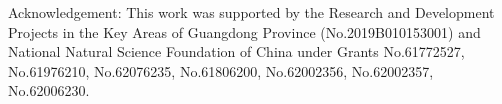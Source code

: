 \documentclass[sigconf]{acmart}
\begin{document}
\begin{acks}
Acknowledgement: This work was supported by the
Research and Development Projects in the Key Areas of Guangdong Province (No.2019B010153001) and
National Natural Science Foundation of China under Grants No.61772527, No.61976210, No.62076235, No.61806200, No.62002356, No.62002357, 
No.62006230.
\end{acks}



\end{document}
